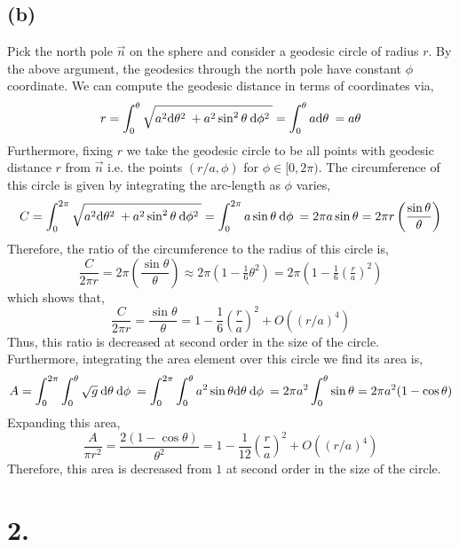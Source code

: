 \documentclass[12pt]{article}
\begin{document}
\subsection*{(b)}

Pick the north pole $\vec{n}$ on the sphere and consider a geodesic circle of radius $r$. By the above argument, the geodesics through the north pole have constant $\phi$ coordinate. We can compute the geodesic distance in terms of coordinates via,
\[ r = \int_0^{\theta} \sqrt{a^2 \mathrm{d}\theta^2 \: + a^2 \sin^2{\theta} \: \mathrm{d}\phi^2 \:} = \int_0^{\theta} a \mathrm{d}\theta \: = a \theta \]
Furthermore, fixing $r$ we take the geodesic circle to be all points with geodesic distance $r$ from $\vec{n}$ i.e. the points $(r/a, \phi)$ for $\phi \in [0, 2 \pi)$. The circumference of this circle is given by integrating the arc-length as $\phi$ varies,
\[ C = \int_0^{2 \pi} \sqrt{a^2 \mathrm{d}\theta^2 \: + a^2 \sin^2{\theta} \: \mathrm{d}\phi^2 \:} = \int_0^{2 \pi} a \sin{\theta} \: \mathrm{d}\phi \: = 2 \pi a \sin{\theta} = 2 \pi r \left( \frac{\sin{\theta}}{\theta} \right) \]
Therefore, the ratio of the circumference to the radius of this circle is,
\[ \frac{C}{2 \pi r} = 2 \pi \left( \frac{\sin{\theta}}{\theta} \right) \approx 2 \pi \left( 1 - \tfrac{1}{6} \theta^2 \right) =  2 \pi \left( 1 - \tfrac{1}{6} \left( \tfrac{r}{a} \right)^2 \right)  \]
which shows that,
\[ \frac{C}{2 \pi r} = \frac{\sin{\theta}}{\theta} = 1 - \frac{1}{6} \left( \frac{r}{a} \right)^2 + O((r/a)^4) \]
Thus, this ratio is decreased at second order in the size of the circle. Furthermore, integrating the area element over this circle we find its area is,
\[ A = \int_0^{2 \pi} \int_0^\theta \sqrt{g} \: \mathrm{d}\theta \: \mathrm{d}\phi \: = \int_0^{2 \pi} \int_0^\theta  a^2 \sin{\theta} \mathrm{d}\theta \: \mathrm{d}\phi \: = 2 \pi a^2 \int_0^\theta \sin{\theta} = 2 \pi a^2 (1 - \cos{\theta}) \]
Expanding this area,
\[ \frac{A}{\pi r^2} = \frac{2(1 - \cos{\theta})}{\theta^2} = 1 - \frac{1}{12} \left( \frac{r}{a} \right)^2 + O((r/a)^4) \]
Therefore, this area is decreased from $1$ at second order in the size of the circle. 

\section*{2.}
\end{document}
